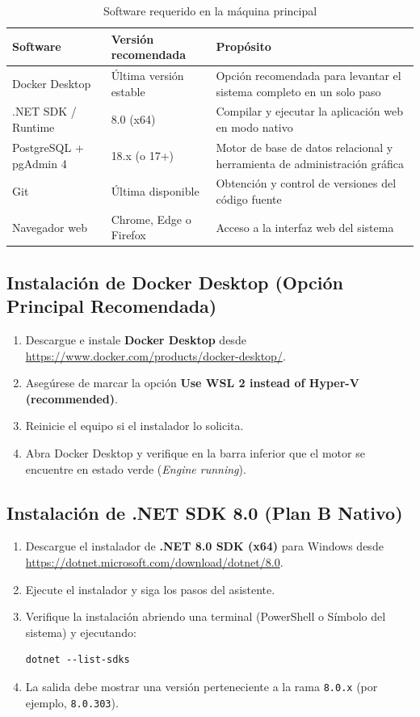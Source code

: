 \begin{table}[h]
    \centering
    \begin{tabular}{|l|l|p{6.5cm}|}
        \hline
        \textbf{Software} & \textbf{Versión recomendada} & \textbf{Propósito} \\ \hline
        Docker Desktop & Última versión estable & Opción recomendada para levantar el sistema completo en un solo paso \\ \hline
        .NET SDK / Runtime & 8.0 (x64) & Compilar y ejecutar la aplicación web en modo nativo \\ \hline
        PostgreSQL + pgAdmin 4 & 18.x (o 17+) & Motor de base de datos relacional y herramienta de administración gráfica \\ \hline
        Git & Última disponible & Obtención y control de versiones del código fuente \\ \hline
        Navegador web & Chrome, Edge o Firefox & Acceso a la interfaz web del sistema \\ \hline
    \end{tabular}
    \caption{Software requerido en la máquina principal}
\end{table}

\subsection{Instalación de Docker Desktop (Opción Principal Recomendada)}
\begin{enumerate}
    \item Descargue e instale \textbf{Docker Desktop} desde \url{https://www.docker.com/products/docker-desktop/}.
    \item Asegúrese de marcar la opción \textbf{Use WSL 2 instead of Hyper-V (recommended)}.
    \item Reinicie el equipo si el instalador lo solicita.
    \item Abra Docker Desktop y verifique en la barra inferior que el motor se encuentre en estado verde (\textit{Engine running}).
\end{enumerate}

\subsection{Instalación de .NET SDK 8.0 (Plan B Nativo)}
\begin{enumerate}
    \item Descargue el instalador de \textbf{.NET 8.0 SDK (x64)} para Windows desde \url{https://dotnet.microsoft.com/download/dotnet/8.0}.
    \item Ejecute el instalador y siga los pasos del asistente.
    \item Verifique la instalación abriendo una terminal (PowerShell o Símbolo del sistema) y ejecutando:
    \begin{lstlisting}[style=consola]
dotnet --list-sdks
\end{lstlisting}
    \item La salida debe mostrar una versión perteneciente a la rama \texttt{8.0.x} (por ejemplo, \texttt{8.0.303}).
\end{enumerate}

